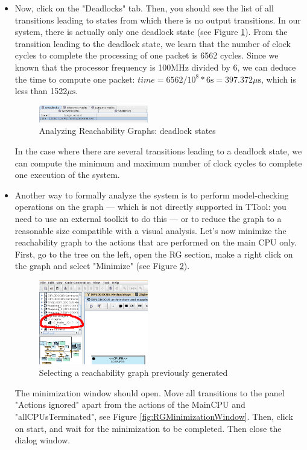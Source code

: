 \documentclass{llncs}
\begin{document}
\begin{itemize}
\item Now, click on the "Deadlocks" tab. Then, you should see the list of all transitions leading to states from which there is no output transitions. In our system, there is actually only one deadlock state (see Figure \ref{fig:RGDeadlock}). From the transition leading to the deadlock state, we learn that the number of clock cycles to complete the processing of one packet is 6562 cycles. Since we known that the processor frequency is 100MHz divided by 6, we can deduce the time to compute one packet: 
$time=6562/10^8*6\text{s}=397.372\mu\text{s}$, which is less than 1522$\mu\text{s}$.

\begin{figure}[!htbp]
	\centering
	\includegraphics[width=0.45\textwidth]{figures/RGDeadlock.png}
	\caption{Analyzing Reachability Graphs: deadlock states}
	\label{fig:RGDeadlock}
\end{figure}
In the case where there are several transitions leading to a deadlock state, we can compute the minimum and maximum number of clock cycles to complete one execution of the system.\\

\item Another way to formally analyze the system is to perform model-checking operations on the graph --- which is not directly supported in TTool: you need to use an external toolkit to do this --- or to reduce the graph to a reasonable size compatible with a visual analysis. Let's now minimize the reachability graph to the actions that are performed on the main CPU only. First, go to the tree on the left, open the RG section, make a right click on the graph and select "Minimize" (see Figure \ref{fig:RGTree}).

\begin{figure}[!htbp]
	\centering
	\includegraphics[width=0.45\textwidth]{figures/RGTree.png}
	\caption{Selecting a reachability graph previously generated}
	\label{fig:RGTree}
\end{figure}
The minimization window should open. Move all transitions to the panel "Actions ignored" apart from the actions of the MainCPU and "allCPUsTerminated", see Figure \ref{fig:RGMinimizationWindow}. Then, click on start, and wait for the minimization to be completed. Then close the dialog window.



\end{itemize}
\end{document}
